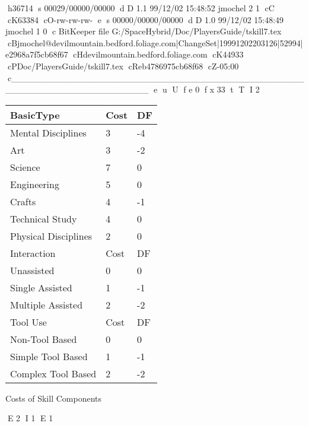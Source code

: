 h36714
s 00029/00000/00000
d D 1.1 99/12/02 15:48:52 jmochel 2 1
cC
cK63384
cO-rw-rw-rw-
e
s 00000/00000/00000
d D 1.0 99/12/02 15:48:49 jmochel 1 0
c BitKeeper file G:/SpaceHybrid/Doc/PlayersGuide/tskill7.tex
cBjmochel@devilmountain.bedford.foliage.com|ChangeSet|19991202203126|52994|e2968a7f5cb68f67
cHdevilmountain.bedford.foliage.com
cK44933
cPDoc/PlayersGuide/tskill7.tex
cReb4786975cb68f68
cZ-05:00
c______________________________________________________________________
e
u
U
f e 0
f x 33
t
T
I 2
\begin{SHTable}
	\begin{tabular}{lll}
    BasicType           & Cost          & DF \\
	\hline
	Mental Disciplines      &       3         & -4 \\
	Art                     &       3         & -2 \\
	Science                 &       7         & 0 \\
	Engineering             &       5         & 0 \\
	Crafts                  &       4         & -1 \\
	Technical Study         &       4         & 0 \\
	Physical Disciplines    &       2         & 0 \\
    \hline
    Interaction                    & Cost          & DF \\
	\hline
	Unassisted              &       0         & 0 \\
	Single Assisted         &       1         & -1 \\
	Multiple Assisted       &       2         & -2 \\    \hline
    Tool Use                       & Cost          & DF \\
	\hline
	Non-Tool Based          &       0         & 0 \\
	Simple Tool Based      &        1         & -1 \\
	Complex Tool Based      &       2         & -2 \\    \hline
	\end{tabular}
    \caption{Costs of Skill Components}\label{Table:SkillComponentCosts}
\end{SHTable}


E 2
I 1
E 1
